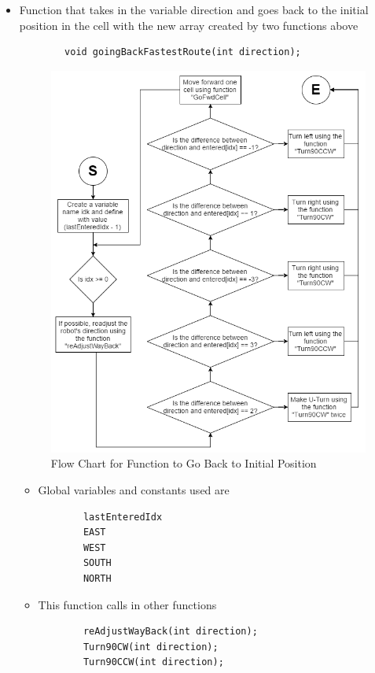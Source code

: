 \documentclass[11pt]{article}
\begin{document}
\begin{itemize}
\newpage
\item Function that takes in the variable direction and goes back to the initial position in the cell with the new array created by two functions above
 	\begin{verbatim}
		void goingBackFastestRoute(int direction);
	\end{verbatim}
\begin{figure}[htp]
\centering
\includegraphics[scale=0.53]{images/Software_Flowchart/goingBackFastestRoute.png}
\caption{Flow Chart for Function to Go Back to Initial Position}
\label{}
\end{figure}
	\begin{itemize}
	\item Global variables and constants used are
	\begin{verbatim}
		lastEnteredIdx
		EAST
		WEST
		SOUTH
		NORTH
	\end{verbatim}
	\item This function calls in other functions
	\begin{verbatim}
		reAdjustWayBack(int direction);	
		Turn90CW(int direction);
		Turn90CCW(int direction);
	\end{verbatim}
	\end{itemize}
\end{itemize}
\newpage
\end{document}
